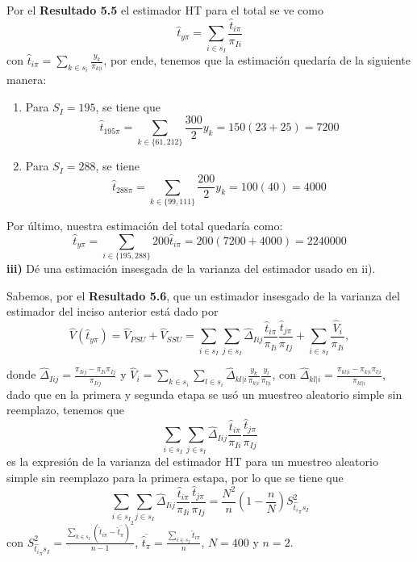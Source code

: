 \documentclass[
]{article}
\begin{document}
Por el \textbf{Resultado 5.5} el estimador HT para el total se ve como
\[\widehat{t}_{y\pi} = \sum_{i\in s_I}\frac{\widehat{t}_{i\pi}}{\pi_{Ii}}\]
con \(\widehat{t}_{i\pi} = \sum_{k\in s_i}\frac{y_k}{\pi_{k|i}}\), por
ende, tenemos que la estimación quedaría de la siguiente manera:

\begin{enumerate}
    \item Para $S_I = 195$, se tiene que
    $$ \widehat{t}_{195\pi} = \sum_{k \in \{61, 212\}}\frac{300}{2}y_k = 150(23 + 25) = 7200$$
    \item Para $S_I = 288$, se tiene
    $$ \widehat{t}_{288\pi} = \sum_{k \in \{99, 111\}}\frac{200}{2}y_k = 100(40) = 4000 $$
\end{enumerate}

Por último, nuestra estimación del total quedaría como:
\[ \widehat{t}_{y\pi} = \sum_{i \in \{195, 288\}}200 \widehat{t}_{i\pi} = 200(7200 + 4000) = 2240000\]
\textbf{iii)} Dé una estimación insesgada de la varianza del estimador
usado en ii).

Sabemos, por el \textbf{Resultado 5.6}, que un estimador insesgado de la
varianza del estimador del inciso anterior está dado por
\[\widehat{V}(\widehat{t}_{y\pi}) = \widehat{V}_{PSU} + \widehat{V}_{SSU} = \sum_{i\in s_I}\sum_{j\in s_I}\widehat{\Delta}_{Iij}\frac{\widehat{t}_{i\pi}}{\pi_{Ii}}\frac{\widehat{t}_{j\pi}}{\pi_{Ij}} + \sum_{i\in s_I}\frac{\widehat{V}_i}{\pi_{Ii}},\]

donde
\(\widehat{\Delta}_{Iij} = \frac{\pi_{Iij} - \pi_{Ii}\pi_{Ij}}{\pi_{Iij}}\)
y
\(\widehat{V}_i= \sum_{k\in s_i}\sum_{l\in s_i} \widehat{\Delta}_{kl|i}\frac{y_k}{\pi_{k|i}}\frac{y_l}{\pi_{l|i}}\),
con
\(\widehat{\Delta}_{kl|i} = \frac{\pi_{kl|i} - \pi_{k|i}\pi_{l|i}}{\pi_{kl|i}}\),
dado que en la primera y segunda etapa se usó un muestreo aleatorio
simple sin reemplazo, tenemos que
\[\sum_{i\in s_I}\sum_{j\in s_I}\widehat{\Delta}_{Iij}\frac{\widehat{t}_{i\pi}}{\pi_{Ii}}\frac{\widehat{t}_{j\pi}}{\pi_{Ij}}\]
es la expresión de la varianza del estimador HT para un muestreo
aleatorio simple sin reemplazo para la primera estapa, por lo que se
tiene que
\[\sum_{i\in s_I}\sum_{j\in s_I}\widehat{\Delta}_{Iij}\frac{\widehat{t}_{i\pi}}{\pi_{Ii}}\frac{\widehat{t}_{j\pi}}{\pi_{Ij}} = \frac{N^2}{n}\left( 1 - \frac{n}{N} \right)S^2_{\widehat{t_i}_\pi s_I}\]
con
\(S^2_{\widehat{t_i}_\pi s_I} = \frac{\sum_{k\in s_I}(\widehat{t}_{i\pi} - \overline{\widehat{t}_{\pi}})^2}{n-1}\),
\(\overline{\widehat{t}_{\pi}} = \frac{\sum_{i\in s_I}\widehat{t}_{i\pi}}{n}\),
\(N = 400\) y \(n = 2\).
\end{document}
